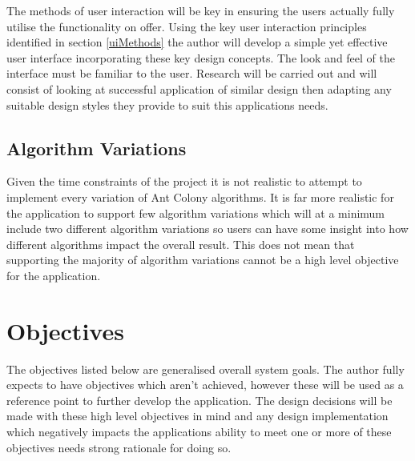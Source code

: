 The methods of user interaction will be key in ensuring the users actually fully utilise the functionality on offer. Using the key user interaction principles identified in section \ref{uiMethods} the author will develop a simple yet effective user interface incorporating these key design concepts. The look and feel of the interface must be familiar to the user. Research will be carried out and will consist of looking at successful application of similar design then adapting any suitable design styles they provide to suit this applications needs.

\subsection{Algorithm Variations}

Given the time constraints of the project it is not realistic to attempt to implement every variation of Ant Colony algorithms. It is far more realistic for the application to support few algorithm variations which will at a minimum include two different algorithm variations so users can have some insight into how different algorithms impact the overall result. This does not mean that supporting the majority of algorithm variations cannot be a high level objective for the application.

\section{Objectives}
\label{objy}
The objectives listed below are generalised overall system goals. The author fully expects to have objectives which aren’t achieved, however these will be used as a reference point to further develop the application. The design decisions will be made with these high level objectives in mind and any design implementation which negatively impacts the applications ability to meet one or more of these objectives needs strong rationale for doing so.

